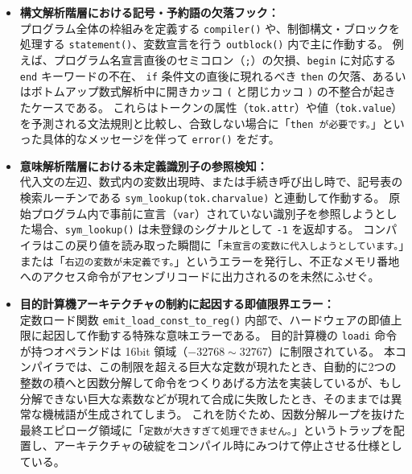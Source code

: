 \documentclass[11pt,a4paper,dvipdfmx]{bxjsarticle}
\begin{document}
\begin{itemize}
    \item \textbf{構文解析階層における記号・予約語の欠落フック：} \\
    プログラム全体の枠組みを定義する \texttt{compiler()} や、制御構文・ブロックを処理する \texttt{statement()}、変数宣言を行う \texttt{outblock()} 内で主に作動する。
    例えば、プログラム名宣言直後のセミコロン（\texttt{;}）の欠損、\texttt{begin} に対応する \texttt{end} キーワードの不在、
    \texttt{if} 条件文の直後に現れるべき \texttt{then} の欠落、あるいはボトムアップ数式解析中に開きカッコ \texttt{(} と閉じカッコ \texttt{)} の不整合が起きたケースである。
    これらはトークンの属性（\texttt{tok.attr}）や値（\texttt{tok.value}）を予測される文法規則と比較し、合致しない場合に「\texttt{then が必要です。}」といった具体的なメッセージを伴って \texttt{error()} をだす。
    
    \item \textbf{意味解析階層における未定義識別子の参照検知：} \\
    代入文の左辺、数式内の変数出現時、または手続き呼び出し時で、記号表の検索ルーチンである \texttt{sym\_lookup(tok.charvalue)} と連動して作動する。
    原始プログラム内で事前に宣言（\texttt{var}）されていない識別子を参照しようとした場合、\texttt{sym\_lookup()} は未登録のシグナルとして \texttt{-1} を返却する。
    コンパイラはこの戻り値を読み取った瞬間に「\texttt{未宣言の変数に代入しようとしています。}」または「\texttt{右辺の変数が未定義です。}」というエラーを発行し、不正なメモリ番地へのアクセス命令がアセンブリコードに出力されるのを未然にふせぐ。
    
    \item \textbf{目的計算機アーキテクチャの制約に起因する即値限界エラー：} \\
    定数ロード関数 \texttt{emit\_load\_const\_to\_reg()} 内部で、ハードウェアの即値上限に起因して作動する特殊な意味エラーである。
    目的計算機の \texttt{loadi} 命令が持つオペランドは 16bit 領域（$-32768 \sim 32767$）に制限されている。
    本コンパイラでは、この制限を超える巨大な定数が現れたとき、自動的に2つの整数の積へと因数分解して命令をつくりあげる方法を実装しているが、もし分解できない巨大な素数などが現れて合成に失敗したとき、そのままでは異常な機械語が生成されてしまう。
    これを防ぐため、因数分解ループを抜けた最終エピローグ領域に「\texttt{定数が大きすぎて処理できません。}」というトラップを配置し、アーキテクチャの破綻をコンパイル時にみつけて停止させる仕様としている。
\end{itemize}
\end{document}

